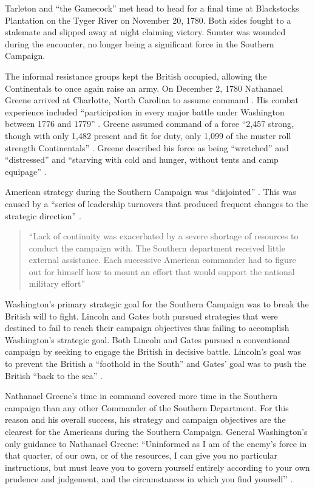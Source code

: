 Tarleton and “the Gamecock” met head to head for a final time at Blackstocks
Plantation on the Tyger River on November 20, 1780.  Both sides fought to a
stalemate and slipped away at night claiming victory.  Sumter was wounded during
the encounter, no longer being a significant force in the Southern Campaign. 

The informal resistance groups kept the British occupied, allowing the
Continentals to once again raise an army.  On December 2, 1780 Nathanael Greene
arrived at Charlotte, North Carolina to assume command \cite[p.22]{moncure_cowpens_1996}.
His combat experience included “participation in every major battle under
Washington between 1776 and 1779” \cite[5]{babits_devil_2001}.  Greene assumed command of a
force “2,457 strong, though with only 1,482 present and fit for duty, only 1,099
of the muster roll strength Continentals”  \cite[27]{weigley_partisan_1970}.
Greene described his force as being “wretched” and “distressed” and “starving
with cold and hunger, without tents and camp equipage”
\cite[23]{moncure_cowpens_1996}. 

American strategy during the Southern Campaign was “disjointed”
\cite[p.60]{woodward_comparative_2002}.
This was caused by a “series of leadership turnovers that produced
frequent changes to the strategic direction”
\cite[61]{woodward_comparative_2002}.  

\begin{quote}
“Lack of continuity was exacerbated by a severe shortage of resources to conduct
the campaign with.  The Southern department received little external assistance.
Each successive American commander had to figure out for himself how to mount an
effort that would support the national military effort”
\cite[p.61]{woodward_comparative_2002}
\end{quote}

Washington's primary strategic goal for the Southern Campaign was to break the
British will to fight.  Lincoln and Gates both pursued strategies that were
destined to fail to reach their campaign objectives thus failing to accomplish
Washington’s strategic goal.  Both Lincoln and Gates pursued a conventional
campaign by seeking to engage the British in decisive battle.  Lincoln’s goal
was to prevent the British a “foothold in the South” and Gates’ goal was to push
the British “back to the sea” \cite[p.64]{woodward_comparative_2002}. 

Nathanael Greene’s time in command covered more time in the Southern campaign
than any other Commander of the Southern Department.  For this reason and his
overall success, his strategy and campaign objectives are the clearest for the
Americans during the Southern Campaign.  General Washington’s only guidance to
Nathanael Greene:  “Uninformed as I am of the enemy’s force in that quarter, of
our own, or of the resources, I can give you no particular instructions, but
must leave you to govern yourself entirely according to your own prudence and
judgement, and the circumstances in which you find yourself”
\cite[p.63]{woodward_comparative_2002}.

